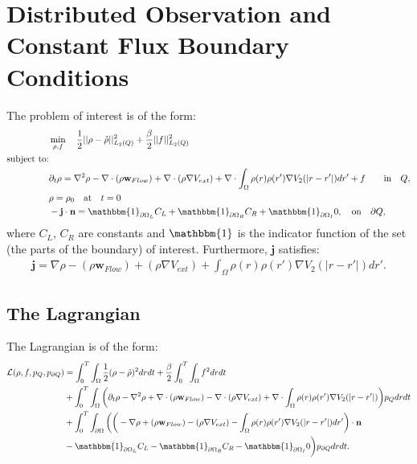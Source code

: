 \documentclass[11pt, a4paper]{article}
\newcommand{\Sta}{\rho}
\newcommand{\Adja}{{p}_Q}
\newcommand{\Adjc}{p_{\partial Q}}
\newcommand{\Con}{{f}}
\newcommand{\nor}{\mathbf{n}}
\theoremstyle{definition}
\begin{document}
\section{Distributed Observation and Constant Flux Boundary Conditions}
The problem of interest is of the form:
\begin{align*}
&\min_{\Sta, \Con} \quad \frac{1}{2}|| \Sta -\hat \Sta||^2_{L_2(Q)} + \frac{\beta}{2}|| \Con||^2_{L_2(Q)}\\
\text{subject to:}\\
&\partial_t \rho = \nabla^2 \rho - \nabla \cdot (\rho \mathbf{w}_{Flow}) +\nabla \cdot (\rho \nabla V_{ext}) + \nabla \cdot \int_\Omega \rho(r) \rho(r') \nabla V_2(|r-r'|) dr' + \Con \quad  \quad\text{in} \quad Q,\notag\\
& \rho = \rho_0 \quad \text{at} \quad t=0 \notag\\
& - \mathbf{j} \cdot \nor = \mathbbm{1}_{\partial \Omega_L} C_L +\mathbbm{1}_{\partial \Omega_R} C_R +\mathbbm{1}_{\partial \Omega_I} 0,  \quad \text{on} \quad \partial Q, 
\end{align*}
where $C_L$, $C_R$ are constants and $\mathbbm{1}$ is the indicator function of the set (the parts of the boundary) of interest.
Furthermore, $\mathbf{j}$ satisfies:
\begin{align*}
\mathbf{j}=\nabla \rho - (\rho \mathbf{w}_{Flow}) +(\rho \nabla V_{ext}) +  \int_\Omega \rho(r) \rho(r') \nabla V_2(|r-r'|) dr'.
\end{align*}
\subsection*{The Lagrangian}
The Lagrangian is of the form:
\begin{align*}
\mathcal{L}(\Sta,\Con,\Adja,\Adjc ) &= \int_0^T \int_\Omega \frac{1}{2}(\Sta - \hat \Sta)^2 dr dt + \frac{\beta}{2}\int_0^T \int_\Omega \Con^2 drdt \\
&+ \int_0^T \int_\Omega \bigg( \partial_t \rho - \nabla^2 \rho + \nabla \cdot (\rho \mathbf{w}_{Flow}) -\nabla \cdot (\rho \nabla V_{ext}) + \nabla \cdot \int_\Omega \rho(r) \rho(r') \nabla V_2(|r-r'|) \bigg) \Adja dr dt\\
&+ \int_0^T \int_{\partial \Omega} \bigg( \bigg( -\nabla \rho+ (\rho \mathbf{w}_{Flow}) -(\rho \nabla V_{ext}) -  \int_\Omega \rho(r) \rho(r') \nabla V_2(|r-r'|) dr' \bigg)\cdot \nor\\
& -\mathbbm{1}_{\partial \Omega_L} C_L -\mathbbm{1}_{\partial \Omega_R} C_R -\mathbbm{1}_{\partial \Omega_I} 0 \bigg) \Adjc dr dt.
\end{align*}
\end{document}
